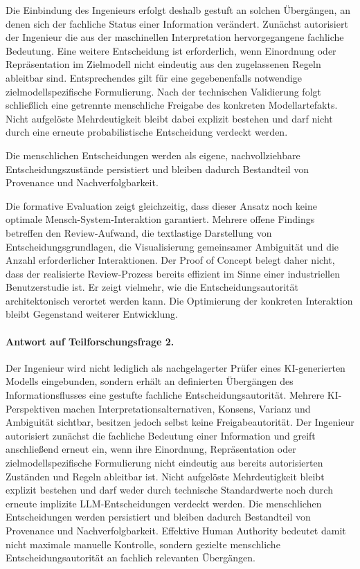 Die Einbindung des Ingenieurs erfolgt deshalb gestuft an solchen Übergängen,
an denen sich der fachliche Status einer Information verändert. Zunächst
autorisiert der Ingenieur die aus der maschinellen Interpretation
hervorgegangene fachliche Bedeutung. Eine weitere Entscheidung ist
erforderlich, wenn Einordnung oder Repräsentation im Zielmodell nicht
eindeutig aus den zugelassenen Regeln ableitbar sind. Entsprechendes gilt für
eine gegebenenfalls notwendige zielmodellspezifische Formulierung. Nach der
technischen Validierung folgt schließlich eine getrennte menschliche
Freigabe des konkreten Modellartefakts. Nicht aufgelöste Mehrdeutigkeit
bleibt dabei explizit bestehen und darf nicht durch eine erneute
probabilistische Entscheidung verdeckt werden.

Die menschlichen Entscheidungen werden als eigene, nachvollziehbare
Entscheidungszustände persistiert und bleiben dadurch Bestandteil von
Provenance und Nachverfolgbarkeit.

Die formative Evaluation zeigt gleichzeitig, dass dieser Ansatz noch keine
optimale Mensch-System-Interaktion garantiert. Mehrere offene Findings
betreffen den Review-Aufwand, die textlastige Darstellung von
Entscheidungsgrundlagen, die Visualisierung gemeinsamer Ambiguität und die
Anzahl erforderlicher Interaktionen. Der Proof of Concept belegt daher nicht,
dass der realisierte Review-Prozess bereits effizient im Sinne einer
industriellen Benutzerstudie ist. Er zeigt vielmehr, wie die
Entscheidungsautorität architektonisch verortet werden kann. Die Optimierung
der konkreten Interaktion bleibt Gegenstand weiterer Entwicklung.

\paragraph{Antwort auf Teilforschungsfrage 2.}

Der Ingenieur wird nicht lediglich als nachgelagerter Prüfer eines
KI-generierten Modells eingebunden, sondern erhält an definierten Übergängen
des Informationsflusses eine gestufte fachliche Entscheidungsautorität.
Mehrere KI-Perspektiven machen Interpretationsalternativen, Konsens, Varianz
und Ambiguität sichtbar, besitzen jedoch selbst keine Freigabeautorität. Der
Ingenieur autorisiert zunächst die fachliche Bedeutung einer Information und
greift anschließend erneut ein, wenn ihre Einordnung, Repräsentation oder
zielmodellspezifische Formulierung nicht eindeutig aus bereits autorisierten
Zuständen und Regeln ableitbar ist. Nicht aufgelöste Mehrdeutigkeit bleibt
explizit bestehen und darf weder durch technische Standardwerte noch durch
erneute implizite LLM-Entscheidungen verdeckt werden. Die menschlichen
Entscheidungen werden persistiert und bleiben dadurch Bestandteil von
Provenance und Nachverfolgbarkeit. Effektive Human Authority bedeutet damit
nicht maximale manuelle Kontrolle, sondern gezielte menschliche
Entscheidungsautorität an fachlich relevanten Übergängen.

